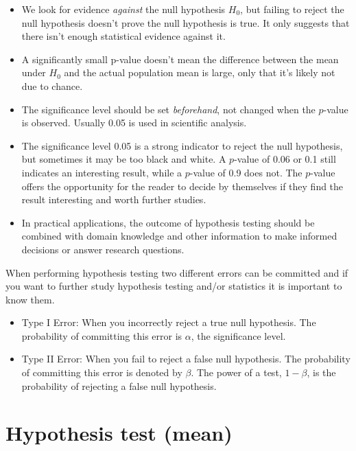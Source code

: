 \documentclass[
  letterpaper,
  DIV=11,
  numbers=noendperiod]{scrreprt}
\providecommand{\tightlist}{%
  \setlength{\itemsep}{0pt}\setlength{\parskip}{0pt}}\usepackage{longtable,booktabs,array}
\begin{document}
\begin{itemize}
\tightlist
\item
  We look for evidence \emph{against} the null hypothesis \(H_0\), but
  failing to reject the null hypothesis doesn't prove the null
  hypothesis is true. It only suggests that there isn't enough
  statistical evidence against it.
\item
  A significantly small p-value doesn't mean the difference between the
  mean under \(H_0\) and the actual population mean is large, only that
  it's likely not due to chance.
\item
  The significance level should be set \emph{beforehand}, not changed
  when the \(p\)-value is observed. Usually 0.05 is used in scientific
  analysis.
\item
  The significance level 0.05 is a strong indicator to reject the null
  hypothesis, but sometimes it may be too black and white. A \(p\)-value
  of 0.06 or 0.1 still indicates an interesting result, while a
  \(p\)-value of 0.9 does not. The \(p\)-value offers the opportunity
  for the reader to decide by themselves if they find the result
  interesting and worth further studies.
\item
  In practical applications, the outcome of hypothesis testing should be
  combined with domain knowledge and other information to make informed
  decisions or answer research questions.
\end{itemize}

When performing hypothesis testing two different errors can be committed
and if you want to further study hypothesis testing and/or statistics it
is important to know them.

\begin{itemize}
\tightlist
\item
  Type I Error: When you incorrectly reject a true null hypothesis. The
  probability of committing this error is \(\alpha\), the significance
  level.
\item
  Type II Error: When you fail to reject a false null hypothesis. The
  probability of committing this error is denoted by \(\beta\). The
  power of a test, \(1 - \beta\), is the probability of rejecting a
  false null hypothesis.
\end{itemize}

\section{Hypothesis test (mean)}\label{hypothesis-test-mean}
\end{document}
